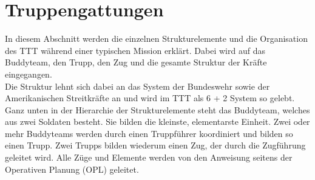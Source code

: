 \newpage
\section{Truppengattungen}
	In diesem Abschnitt werden die einzelnen Strukturelemente und die Organisation des \ac{TTT} während einer typischen Mission erklärt. Dabei wird auf das Buddyteam, den Trupp, den Zug und die gesamte Struktur der Kräfte eingegangen.\\
	Die Struktur lehnt sich dabei an das System der Bundeswehr sowie der Amerikanischen Streitkräfte an und wird im \ac{TTT} als 6 + 2 System so gelebt.\\
	Ganz unten in der Hierarchie der Strukturelemente steht das Buddyteam, welches aus zwei Soldaten besteht. Sie bilden die kleinste, elementarste Einheit. Zwei oder mehr Buddyteams werden durch einen Truppführer koordiniert und bilden so einen Trupp. Zwei Trupps bilden wiederum einen Zug, der durch die Zugführung geleitet wird. Alle Züge und Elemente werden von den Anweisung seitens der Operativen Planung (\ac{OPL}) geleitet.  










